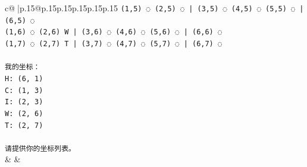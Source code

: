 \documentclass{article}
\begin{document}
{\begin{supertabular}{c@{$\;$}|p{.15\linewidth}@{}p{.15\linewidth}p{.15\linewidth}p{.15\linewidth}p{.15\linewidth}p{.15\linewidth}}
{{{\texttt{(1,5) ◌ (2,5) ◌ | (3,5) ◌ (4,5) ◌ (5,5) ◌ | (6,5) ◌} \\
\texttt{(1,6) ◌ (2,6) W | (3,6) ◌ (4,6) ◌ (5,6) ◌ | (6,6) ◌} \\
\texttt{(1,7) ◌ (2,7) T | (3,7) ◌ (4,7) ◌ (5,7) ◌ | (6,7) ◌} \\
\\ 
\texttt{我的坐标：} \\
\texttt{H: (6, 1)} \\
\texttt{C: (1, 3)} \\
\texttt{I: (2, 3)} \\
\texttt{W: (2, 6)} \\
\texttt{T: (2, 7)} \\
\\ 
\texttt{请提供你的坐标列表。} \\
            }
        }
    }
    & & \\ \\


\end{supertabular}}
\end{document}
